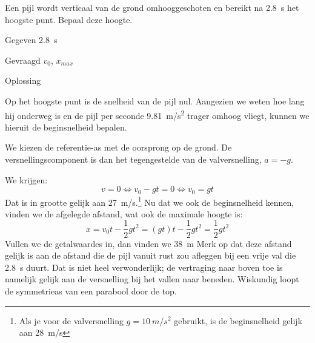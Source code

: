 
\item[\SI{80}{\percent} (b)] Een pijl wordt verticaal van de grond omhooggeschoten en bereikt na \SI{2,8}{s} het hoogste punt. Bepaal deze hoogte.
\begin{oplossing}
\item[Gegeven]\SI{2,8}{s}
\item[Gevraagd]$v_0$, $x_{max}$

\item[Oplossing]\begin{minipage}[t]{0.6\linewidth}
	Op het hoogste punt is de snelheid van de pijl nul. Aangezien we weten hoe lang hij onderweg is en de pijl per seconde \SI{9,81}{m/s^2} trager omhoog vliegt, kunnen we hieruit de beginsnelheid bepalen. 
	
	We kiezen de referentie-as met de oorsprong op de grond. De versnellingscomponent is dan het tegengestelde van de valversnelling, $a=-g$.
\end{minipage}%
\begin{minipage}[t]{0.37\linewidth}
	\raisebox{1ex-\height}{%
	\texttt{[image: 55p44]}%
	}
\end{minipage}

We krijgen:
\begin{equation*}
v=0\Leftrightarrow v_0-gt=0\Leftrightarrow v_0=gt
\end{equation*}
Dat is in grootte gelijk aan \SI{27}{m/s}.\footnote{Als je voor de valversnelling $g=\SI{10}{m/s^2}$ gebruikt, is de beginsnelheid gelijk aan \SI{28}{m/s}} Nu dat we ook de beginsnelheid kennen, vinden we de afgelegde afstand, wat ook de maximale hoogte is:
\begin{equation*}
x=v_0t-\frac{1}{2}gt^2=(gt)t-\frac{1}{2}gt^2=\frac{1}{2}gt^2
\end{equation*}
Vullen we de getalwaardes in, dan vinden we \SI{38}{m}
\newline
\newline
Merk op dat deze afstand gelijk is aan de afstand die de pijl vanuit rust zou afleggen bij een vrije val die \SI{2,8}{s} duurt. Dat is niet heel verwonderlijk; de vertraging naar boven toe is namelijk gelijk aan de versnelling bij het vallen naar beneden. Wiskundig loopt de symmetrieas van een parabool door de top. 

\end{oplossing}